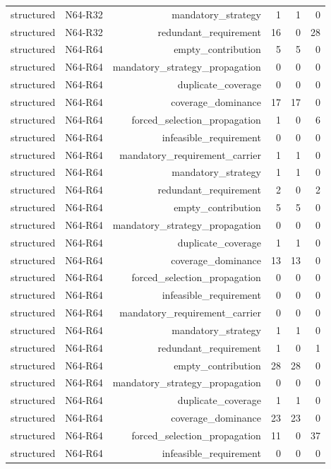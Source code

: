 {\begin{longtable}{lrrrrr}
structured & N64-R32 & mandatory\_strategy & 1 & 1 & 0 \\
structured & N64-R32 & redundant\_requirement & 16 & 0 & 28 \\
structured & N64-R64 & empty\_contribution & 5 & 5 & 0 \\
structured & N64-R64 & mandatory\_strategy\_propagation & 0 & 0 & 0 \\
structured & N64-R64 & duplicate\_coverage & 0 & 0 & 0 \\
structured & N64-R64 & coverage\_dominance & 17 & 17 & 0 \\
structured & N64-R64 & forced\_selection\_propagation & 1 & 0 & 6 \\
structured & N64-R64 & infeasible\_requirement & 0 & 0 & 0 \\
structured & N64-R64 & mandatory\_requirement\_carrier & 1 & 1 & 0 \\
structured & N64-R64 & mandatory\_strategy & 1 & 1 & 0 \\
structured & N64-R64 & redundant\_requirement & 2 & 0 & 2 \\
structured & N64-R64 & empty\_contribution & 5 & 5 & 0 \\
structured & N64-R64 & mandatory\_strategy\_propagation & 0 & 0 & 0 \\
structured & N64-R64 & duplicate\_coverage & 1 & 1 & 0 \\
structured & N64-R64 & coverage\_dominance & 13 & 13 & 0 \\
structured & N64-R64 & forced\_selection\_propagation & 0 & 0 & 0 \\
structured & N64-R64 & infeasible\_requirement & 0 & 0 & 0 \\
structured & N64-R64 & mandatory\_requirement\_carrier & 0 & 0 & 0 \\
structured & N64-R64 & mandatory\_strategy & 1 & 1 & 0 \\
structured & N64-R64 & redundant\_requirement & 1 & 0 & 1 \\
structured & N64-R64 & empty\_contribution & 28 & 28 & 0 \\
structured & N64-R64 & mandatory\_strategy\_propagation & 0 & 0 & 0 \\
structured & N64-R64 & duplicate\_coverage & 1 & 1 & 0 \\
structured & N64-R64 & coverage\_dominance & 23 & 23 & 0 \\
structured & N64-R64 & forced\_selection\_propagation & 11 & 0 & 37 \\
structured & N64-R64 & infeasible\_requirement & 0 & 0 & 0 \\

\end{longtable}}
